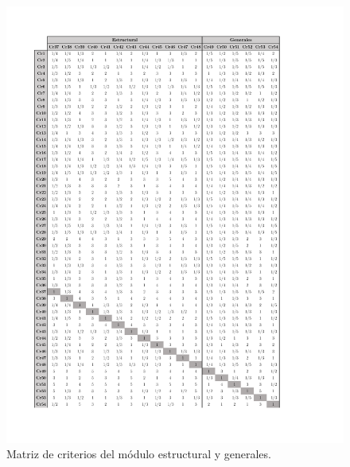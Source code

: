 \newpage
\begin{figure}[H]
	\centering
	\includegraphics[width=16cm]{imagenes/MNormal3Ex}
	\caption{Matriz de criterios del módulo estructural y generales.}
	\label{fig:MNormal3Ex}
\end{figure}

